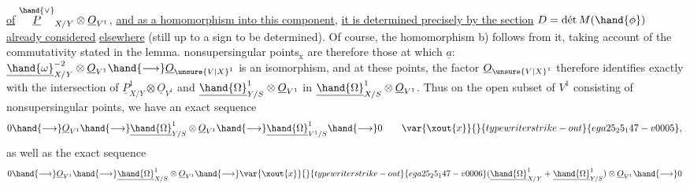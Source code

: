 
\uline{of} $\overset{\hand{\vee}}{\underline{P}}_{X/Y}\otimes\underline{O}_{V^1}$, \uline{and as a homomorphism into this component,}
\uline{it is determined precisely by the section} $D = \text{dét}\,M(\hand{\phi})$ \uline{already considered}
\uline{elsewhere} (still up to a sign to be determined). Of course,
the homomorphism b) follows from it, taking account of the commutativity stated
in the lemma.  nonsupersingular points$_{\text{x}}$ are therefore 
those at which $\underline{a}$: $\underline{\hand{\omega}}^{-2}_{X/Y}\otimes\underline{O}_{V^1}\hand{\longrightarrow}\underline{O}_{\unsure{V|X}^1}$ is an isomorphism, and at
these points,  the factor $\underline{O}_{\unsure{V|X}^1}$ therefore identifies
exactly with the intersection of $\underline{P}^1_{X/Y}\otimes\underline{O}_{V^1}$ and $\underline{\hand{\Omega}}^1_{Y/S}\otimes\underline{O}_{V^1}$
in $\underline{\hand{\Omega}}^1_{X/S}\otimes\underline{O}_{V^1}$. Thus on the open subset of $V^1$ consisting of nonsupersingular
points, we have an exact sequence
\[ 0\hand{\longrightarrow}\underline{O}_{V^1}\hand{\longrightarrow}\underline{\hand{\Omega}}^1_{Y/S}\otimes\underline{O}_{V^1}\hand{\longrightarrow}\underline{\hand{\Omega}}^1_{V^1/S}\hand{\longrightarrow} 0 \qquad \var{\xout{x}}{}{typewriter strike-out}{ega25_25_147-v0005}, \]
as well as the exact sequence
\[ 0\hand{\longrightarrow}\underline{O}_{V^1}\hand{\longrightarrow}\underline{\hand{\Omega}}^1_{X/S}\otimes\underline{O}_{V^1}\hand{\longrightarrow}\var{\xout{x}}{}{typewriter strike-out}{ega25_25_147-v0006}(\underline{\hand{\Omega}}^1_{X/Y}+\underline{\hand{\Omega}}^1_{Y/S})\otimes\underline{O}_{V^1}\hand{\longrightarrow} 0 \]

